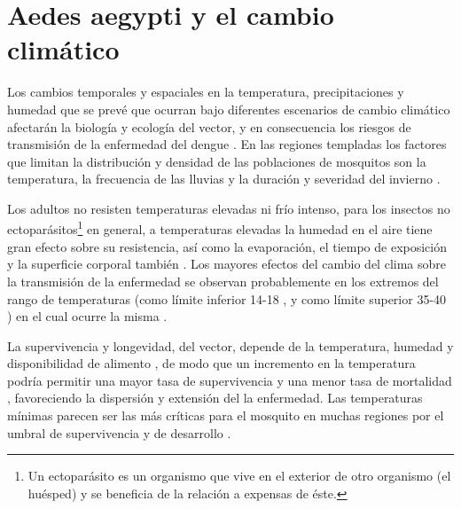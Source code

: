 \section{Aedes aegypti y el cambio climático}
\label{sec:cap-3-cambio-climatico}
Los cambios temporales y espaciales en la temperatura, precipitaciones y humedad que se prevé que
ocurran bajo diferentes escenarios de cambio climático afectarán la biología y ecología del vector,
y en consecuencia los riesgos de transmisión de la enfermedad del dengue \cite{dengueUruguayCap2}
.  En las regiones templadas los factores que limitan la distribución y densidad de las poblaciones
de mosquitos son la temperatura, la frecuencia de las lluvias y la duración y severidad del
invierno \cite{ThironIzcazaJ2003}.

Los adultos no resisten temperaturas elevadas ni frío intenso, para los insectos no ectoparásitos\footnote{Un ectoparásito es un organismo que vive en el exterior de otro organismo (el huésped) y se beneficia de la relación a expensas de éste.}
en general, a temperaturas elevadas la humedad en el aire tiene gran efecto sobre su resistencia,
así como la evaporación, el tiempo de exposición y la superficie corporal también
\cite{ThironIzcazaJ2003}. Los mayores efectos del cambio del clima sobre la transmisión de la
enfermedad se observan probablemente en los extremos del rango de temperaturas (como límite
inferior 14-18 \textcelsius, y como límite superior 35-40 \textcelsius ) en el cual ocurre la misma
\cite{dengueUruguayCap2}.

La supervivencia y longevidad, del vector, depende de la temperatura, humedad y disponibilidad de
alimento \cite{ThironIzcazaJ2003}, de modo que un incremento en la temperatura podría permitir una
mayor tasa de supervivencia y una menor tasa de mortalidad \cite{dengueUruguayCap2}, favoreciendo
la dispersión y extensión del la enfermedad. Las temperaturas mínimas parecen ser las más críticas
para el mosquito en muchas regiones por el umbral de supervivencia y de desarrollo
\cite{dengueUruguayCap2}.
